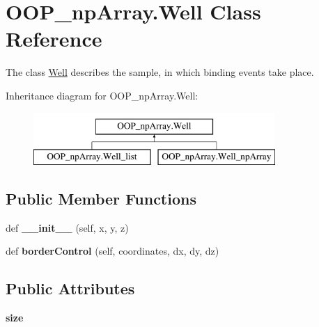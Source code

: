 \hypertarget{class_o_o_p__np_array_1_1_well}{}\section{O\+O\+P\+\_\+np\+Array.\+Well Class Reference}
\label{class_o_o_p__np_array_1_1_well}


The class \mbox{\hyperlink{class_o_o_p__np_array_1_1_well}{Well}} describes the sample, in which binding events take place.  


Inheritance diagram for O\+O\+P\+\_\+np\+Array.\+Well\+:\begin{figure}[H]
\begin{center}
\leavevmode
\includegraphics[height=2.000000cm]{class_o_o_p__np_array_1_1_well}
\end{center}
\end{figure}
\subsection*{Public Member Functions}
\begin{DoxyCompactItemize}
\item 
\mbox{\label{class_o_o_p__np_array_1_1_well_ab7cb865616e6fd3e6e98604400329f0c}} 
def {\bfseries \+\_\+\+\_\+init\+\_\+\+\_\+} (self, x, y, z)
\item 
\mbox{\label{class_o_o_p__np_array_1_1_well_a8991b9d19614962be6a088031f780554}} 
def {\bfseries border\+Control} (self, coordinates, dx, dy, dz)
\end{DoxyCompactItemize}
\subsection*{Public Attributes}
\begin{DoxyCompactItemize}
\item 
\mbox{\label{class_o_o_p__np_array_1_1_well_a7ef6da8f1d375133df8edff40ef3d48d}} 
{\bfseries size}
\end{DoxyCompactItemize}


